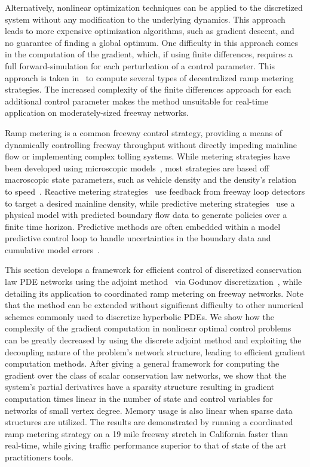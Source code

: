 Alternatively, nonlinear optimization techniques can be applied to the 
discretized system without any modification to the underlying dynamics. This 
approach leads to more expensive optimization algorithms, such as gradient 
descent, and no guarantee of finding a global optimum. One difficulty in this 
approach comes in the computation of the gradient, which, if using finite 
differences, requires a full forward-simulation for each perturbation of a 
control parameter. This approach is taken in~\cite{Ramon2013,Frejo2011} to 
compute several types of decentralized ramp metering strategies. The increased 
complexity of the finite differences approach for each additional control 
parameter makes the method unsuitable for real-time application on 
moderately-sized freeway networks.

Ramp metering is a common freeway control strategy, providing a means of 
dynamically controlling freeway throughput without directly impeding mainline 
flow or implementing complex tolling systems. While metering strategies have 
been developed using microscopic models~\cite{Ben-Akiva2003}, most strategies 
are based off macroscopic state parameters, such as vehicle density and the 
density's relation to 
speed~\cite{richards1956shock,lighthill1955kinematic,daganzo1995cell}. Reactive 
metering strategies~\cite{Papageorgiou1991Alinea,Papamichail,Kachroo2003} use 
feedback from freeway loop detectors to target a desired mainline density, 
while predictive metering 
strategies~\cite{Frejo2011,Kotsialos2004,gomes2006optimal,Chen1997} use a 
physical model with predicted boundary flow data to generate policies over a 
finite time horizon. Predictive methods are often embedded within a model 
predictive control loop to handle uncertainties in the boundary data and 
cumulative model errors~\cite{Muralidharana}.

This section develops a framework for efficient control of discretized 
conservation law PDE networks using the adjoint 
method~\cite{Giles2000,Pironneau1974} via Godunov 
discretization~\cite{godunov1959}, while detailing its application to 
coordinated ramp metering on freeway networks. Note that the method can be 
extended without significant difficulty to other numerical schemes commonly 
used to discretize hyperbolic PDEs. We show how the complexity of 
the gradient computation in nonlinear optimal control problems can be greatly 
decreased by using the discrete adjoint method and exploiting the decoupling 
nature of the problem's network structure, leading to efficient gradient 
computation methods. After giving a general framework for computing the gradient 
over the class of scalar conservation law networks, we show that the system's 
partial derivatives have a sparsity structure resulting in gradient computation 
times linear in the number of state and control variables for networks of small 
vertex degree. Memory usage is also linear when sparse data structures are utilized. The results are 
demonstrated by running a coordinated ramp metering strategy on a 19 mile 
freeway stretch in California faster than real-time, while giving traffic 
performance superior to that of state of the art practitioners tools.

